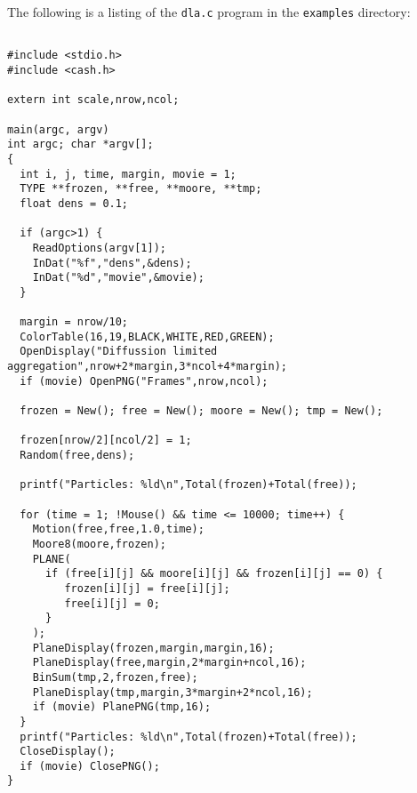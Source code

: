 \documentclass[12pt]{article}
\begin{document}
The following is a listing of the {\tt dla.c} program
in the {\tt examples} directory:
\begin{verbatim}

#include <stdio.h>
#include <cash.h>

extern int scale,nrow,ncol;

main(argc, argv)
int argc; char *argv[];
{
  int i, j, time, margin, movie = 1;
  TYPE **frozen, **free, **moore, **tmp;
  float dens = 0.1;

  if (argc>1) {
    ReadOptions(argv[1]);
    InDat("%f","dens",&dens);
    InDat("%d","movie",&movie);
  }

  margin = nrow/10;
  ColorTable(16,19,BLACK,WHITE,RED,GREEN);
  OpenDisplay("Diffussion limited aggregation",nrow+2*margin,3*ncol+4*margin);
  if (movie) OpenPNG("Frames",nrow,ncol);

  frozen = New(); free = New(); moore = New(); tmp = New();

  frozen[nrow/2][ncol/2] = 1;
  Random(free,dens);

  printf("Particles: %ld\n",Total(frozen)+Total(free));

  for (time = 1; !Mouse() && time <= 10000; time++) {
    Motion(free,free,1.0,time);
    Moore8(moore,frozen);
    PLANE(
      if (free[i][j] && moore[i][j] && frozen[i][j] == 0) {
         frozen[i][j] = free[i][j];
         free[i][j] = 0;
      }
    );
    PlaneDisplay(frozen,margin,margin,16);
    PlaneDisplay(free,margin,2*margin+ncol,16);
    BinSum(tmp,2,frozen,free);
    PlaneDisplay(tmp,margin,3*margin+2*ncol,16);
    if (movie) PlanePNG(tmp,16);
  }
  printf("Particles: %ld\n",Total(frozen)+Total(free));
  CloseDisplay();
  if (movie) ClosePNG();
}
\end{verbatim}
\end{document}
